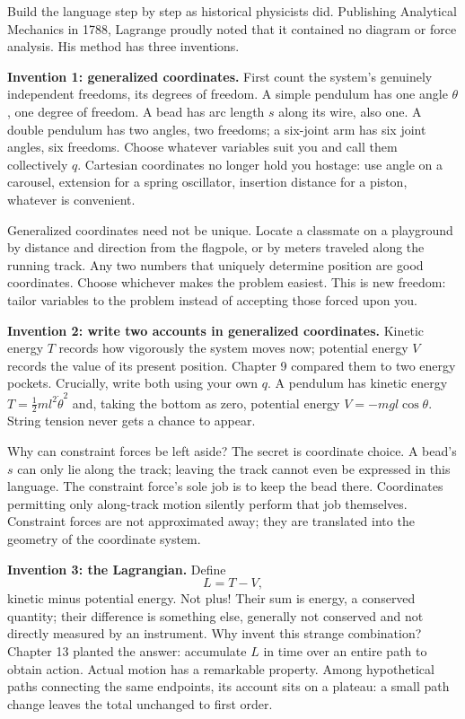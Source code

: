 \begin{mainline}
Build the language step by step as historical physicists did. Publishing Analytical Mechanics in 1788, Lagrange proudly noted that it contained no diagram or force analysis. His method has three inventions.

\textbf{Invention 1: generalized coordinates.} First count the system's genuinely independent freedoms, its degrees of freedom. A simple pendulum has one angle \(\theta\), one degree of freedom. A bead has arc length \(s\) along its wire, also one. A double pendulum has two angles, two freedoms; a six-joint arm has six joint angles, six freedoms. Choose whatever variables suit you and call them collectively \(q\). Cartesian coordinates no longer hold you hostage: use angle on a carousel, extension for a spring oscillator, insertion distance for a piston, whatever is convenient.

Generalized coordinates need not be unique. Locate a classmate on a playground by distance and direction from the flagpole, or by meters traveled along the running track. Any two numbers that uniquely determine position are good coordinates. Choose whichever makes the problem easiest. This is new freedom: tailor variables to the problem instead of accepting those forced upon you.

\textbf{Invention 2: write two accounts in generalized coordinates.} Kinetic energy \(T\) records how vigorously the system moves now; potential energy \(V\) records the value of its present position. Chapter 9 compared them to two energy pockets. Crucially, write both using your own \(q\). A pendulum has kinetic energy \(T=\frac{1}{2}ml^2\dot{\theta}^2\) and, taking the bottom as zero, potential energy \(V=-mgl\cos\theta\). String tension never gets a chance to appear.

Why can constraint forces be left aside? The secret is coordinate choice. A bead's \(s\) can only lie along the track; leaving the track cannot even be expressed in this language. The constraint force's sole job is to keep the bead there. Coordinates permitting only along-track motion silently perform that job themselves. Constraint forces are not approximated away; they are translated into the geometry of the coordinate system.

\textbf{Invention 3: the Lagrangian.} Define
\[
L=T-V,
\]
kinetic minus potential energy. Not plus! Their sum is energy, a conserved quantity; their difference is something else, generally not conserved and not directly measured by an instrument. Why invent this strange combination? Chapter 13 planted the answer: accumulate \(L\) in time over an entire path to obtain action. Actual motion has a remarkable property. Among hypothetical paths connecting the same endpoints, its account sits on a plateau: a small path change leaves the total unchanged to first order.


\end{mainline}
